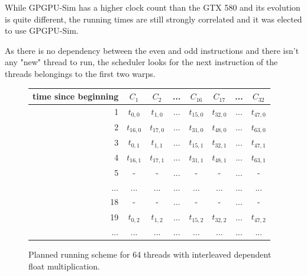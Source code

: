 \documentclass{report}
\begin{document}
    While GPGPU-Sim has a higher clock count than the GTX 580 and its evolution is quite different, the running times are still strongly correlated and it was elected to use GPGPU-Sim.

As there is no dependency between the even and odd instructions and there isn't any "new" thread to run, the scheduler looks for the next instruction of the threads belongings to the first two warps.
\begin{figure}[H]
      \centering
       \begin{tabular}{ | r || c | c | c | c || c | c | c | }
    	    \hline
    	    time since beginning & $C_1$ & $C_2$ & ... & $C_{16}$ & $C_{17}$ & ... & $C_{32}$ \\ \hline  \hline
    	   1 & $t_{0,0}$ & $t_{1,0}$ & ... & $t_{15,0}$ & $t_{32, 0}$ & ... & $t_{47, 0}$ \\ \hline 
    	   2 & $t_{16,0}$ & $t_{17,0}$ & ... & $t_{31,0}$ & $t_{48, 0}$ & ... & $t_{63, 0}$ \\ \hline
    	   3 & $t_{0,1}$ & $t_{1,1}$ & ... & $t_{15,1}$ & $t_{32, 1}$ & ... & $t_{47, 1}$ \\ \hline
           4 & $t_{16,1}$ & $t_{17,1}$ & ... & $t_{31,1}$ & $t_{48, 1}$ & ... & $t_{63, 1}$ \\ \hline
    	   5 & - & - & ... & - & - & ... & - \\ \hline
    	   ... & ... & ... & ... & ... & ... & ... & ... \\ \hline
    	   18 & - & - & ... & - & - & ... & - \\ \hline
    	   19 & $t_{0,2}$ & $t_{1,2}$ & ... & $t_{15,2}$ & $t_{32,2}$ & ... & $t_{47,2}$ \\ \hline
    	   ... & ... & ... & ... & ... & ... & ... & ... \\ \hline
  	\end{tabular}
  	\captionsetup{justification=centering}
  	\caption{Planned running scheme for 64 threads with interleaved dependent float multiplication.}
  	\label{fig:fp_prediction_64_halfdep}
   \end{figure}
   
   {}
   
\end{document}
